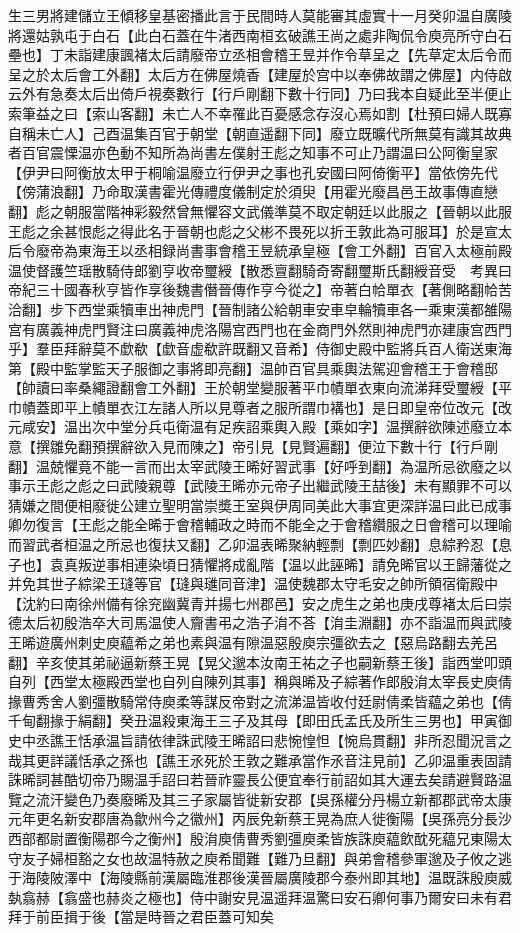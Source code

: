 生三男將建儲立王傾移皇基密播此言于民間時人莫能審其虛實十一月癸卯温自廣陵將還姑孰屯于白石【此白石蓋在牛渚西南桓玄破譙王尚之處非陶侃令庾亮所守白石壘也】丁未詣建康諷褚太后請廢帝立丞相會稽王昱并作令草呈之【先草定太后令而呈之於太后會工外翻】太后方在佛屋燒香【建屋於宫中以奉佛故謂之佛屋】内侍啟云外有急奏太后出倚戶視奏數行【行戶剛翻下數十行同】乃曰我本自疑此至半便止索筆益之曰【索山客翻】未亡人不幸罹此百憂感念存沒心焉如割【杜預曰婦人既寡自稱未亡人】己酉温集百官于朝堂【朝直遥翻下同】廢立既曠代所無莫有識其故典者百官震慄温亦色動不知所為尚書左僕射王彪之知事不可止乃謂温曰公阿衡皇家【伊尹曰阿衡放太甲于桐喻温廢立行伊尹之事也孔安國曰阿倚衡平】當依傍先代【傍蒲浪翻】乃命取漢書霍光傳禮度儀制定於須臾【用霍光廢昌邑王故事傳直戀翻】彪之朝服當階神彩毅然曾無懼容文武儀準莫不取定朝廷以此服之【晉朝以此服王彪之余甚恨彪之得此名于晉朝也彪之父彬不畏死以折王敦此為可服耳】於是宣太后令廢帝為東海王以丞相録尚書事會稽王昱統承皇極【會工外翻】百官入太極前殿温使督護竺瑶散騎侍郎劉亨收帝璽綬【散悉亶翻騎奇寄翻璽斯氏翻綬音受　考異曰帝紀三十國春秋亨皆作享後魏書僭晉傳作亨今從之】帝著白帢單衣【著側略翻帢苦洽翻】步下西堂乘犢車出神虎門【晉制諸公給朝車安車皁輪犢車各一乘東漢都雒陽宫有廣義神虎門賢注曰廣義神虎洛陽宫西門也在金商門外然則神虎門亦建康宫西門乎】羣臣拜辭莫不歔欷【歔音虚欷許既翻又音希】侍御史殿中監將兵百人衛送東海第【殿中監掌監天子服御之事將即亮翻】温帥百官具乘輿法駕迎會稽王于會稽邸【帥讀曰率桑繩證翻會工外翻】王於朝堂變服著平巾幘單衣東向流涕拜受璽綬【平巾幘蓋即平上幘單衣江左諸人所以見尊者之服所謂巾褠也】是日即皇帝位改元【改元咸安】温出次中堂分兵屯衛温有足疾詔乘輿入殿【乘如字】温撰辭欲陳述廢立本意【撰雛免翻預撰辭欲入見而陳之】帝引見【見賢遍翻】便泣下數十行【行戶剛翻】温兢懼竟不能一言而出太宰武陵王晞好習武事【好呼到翻】為温所忌欲廢之以事示王彪之彪之曰武陵親尊【武陵王晞亦元帝子出繼武陵王喆後】未有顯罪不可以猜嫌之間便相廢徙公建立聖明當崇奬王室與伊周同美此大事宜更深詳温曰此已成事卿勿復言【王彪之能全晞于會稽輔政之時而不能全之于會稽纘服之日會稽可以理喻而習武者桓温之所忌也復扶又翻】乙卯温表晞聚納輕剽【剽匹妙翻】息綜矜忍【息子也】袁真叛逆事相連染頃日猜懼將成亂階【温以此誣晞】請免晞官以王歸藩從之并免其世子綜梁王㻱等官【㻱與璡同音津】温使魏郡太守毛安之帥所領宿衛殿中【沈約曰南徐州備有徐兖幽冀青并揚七州郡邑】安之虎生之弟也庚戌尊褚太后曰崇德太后初殷浩卒大司馬温使人齎書弔之浩子㳙不荅【㳙圭淵翻】亦不詣温而與武陵王晞遊廣州刺史庾藴希之弟也素與温有隙温惡殷庾宗彊欲去之【惡烏路翻去羌呂翻】辛亥使其弟祕逼新蔡王晃【晃父邈本汝南王祐之子也嗣新蔡王後】詣西堂叩頭自列【西堂太極殿西堂也自列自陳列其事】稱與晞及子綜著作郎殷㳙太宰長史庾倩掾曹秀舍人劉彊散騎常侍庾柔等謀反帝對之流涕温皆收付廷尉倩柔皆藴之弟也【倩千甸翻掾于絹翻】癸丑温殺東海王三子及其母【即田氏孟氏及所生三男也】甲寅御史中丞譙王恬承温旨請依律誅武陵王晞詔曰悲惋惶怛【惋烏貫翻】非所忍聞況言之哉其更詳議恬承之孫也【譙王氶死於王敦之難承當作氶音注見前】乙卯温重表固請誅晞詞甚酷切帝乃賜温手詔曰若晉祚靈長公便宜奉行前詔如其大運去矣請避賢路温覽之流汗變色乃奏廢晞及其三子家屬皆徙新安郡【吳孫權分丹楊立新都郡武帝太康元年更名新安郡唐為歙州今之徽州】丙辰免新蔡王晃為庶人徙衡陽【吳孫亮分長沙西部都尉置衡陽郡今之衡州】殷㳙庾倩曹秀劉彊庾柔皆族誅庾藴飲酖死藴兄東陽太守友子婦桓豁之女也故温特赦之庾希聞難【難乃旦翻】與弟會稽參軍邈及子攸之逃于海陵陂澤中【海陵縣前漢屬臨淮郡後漢晉屬廣陵郡今泰州即其地】温既誅殷庾威埶翕赫【翕盛也赫炎之極也】侍中謝安見温遥拜温驚曰安石卿何事乃爾安曰未有君拜于前臣揖于後【當是時晉之君臣蓋可知矣
